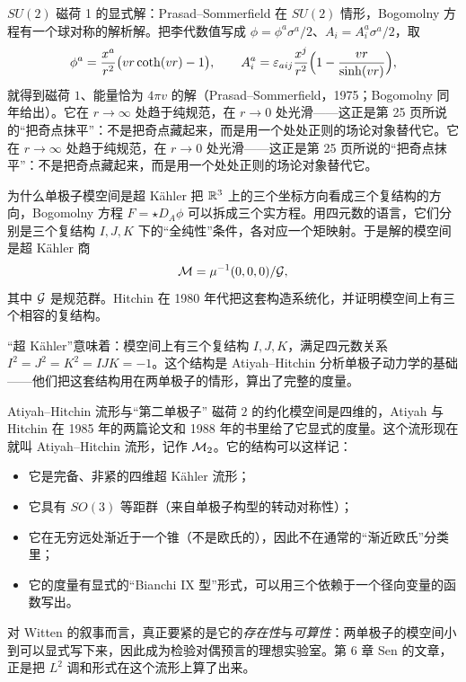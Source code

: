 \begin{pizhu}{$SU(2)$ 磁荷 1 的显式解：Prasad--Sommerfield}
在 $SU(2)$ 情形，Bogomolny 方程有一个球对称的解析解。把李代数值写成 $\phi=\phi^a\sigma^a/2$、$A_i=A_i^a\sigma^a/2$，取
\[
  \phi^a=\frac{x^a}{r^2}\bigl(vr\coth(vr)-1\bigr),\qquad
  A_i^a=\varepsilon_{aij}\frac{x^j}{r^2}\Bigl(1-\frac{vr}{\sinh(vr)}\Bigr),
\]
就得到磁荷 $1$、能量恰为 $4\pi v$ 的解（Prasad--Sommerfield，1975；Bogomolny 同年给出）。它在 $r\to\infty$ 处趋于纯规范，在 $r\to0$ 处光滑——这正是第 25 页所说的“把奇点抹平”：不是把奇点藏起来，而是用一个处处正则的场论对象替代它。它在 $r\to\infty$ 处趋于纯规范，在 $r\to0$ 处光滑——这正是第 25 页所说的“把奇点抹平”：不是把奇点藏起来，而是用一个处处正则的场论对象替代它。
\end{pizhu}

\begin{pizhu}{为什么单极子模空间是超 Kähler}
把 $\mathbb{R}^3$ 上的三个坐标方向看成三个复结构的方向，Bogomolny 方程 $F=\star D_A\phi$ 可以拆成三个实方程。用四元数的语言，它们分别是三个复结构 $I,J,K$ 下的“全纯性”条件，各对应一个矩映射。于是解的模空间是超 Kähler 商
\[
  \mathcal{M}=\mu^{-1}(0,0,0)/\mathcal{G} ,
\]
其中 $\mathcal{G}$ 是规范群。Hitchin 在 1980 年代把这套构造系统化，并证明模空间上有三个相容的复结构。

“超 Kähler”意味着：模空间上有三个复结构 $I,J,K$，满足四元数关系 $I^2=J^2=K^2=IJK=-1$。这个结构是 Atiyah--Hitchin 分析单极子动力学的基础——他们把这套结构用在两单极子的情形，算出了完整的度量。
\end{pizhu}

\begin{pizhu}{Atiyah--Hitchin 流形与“第二单极子”}
磁荷 $2$ 的约化模空间是四维的，Atiyah 与 Hitchin 在 1985 年的两篇论文和 1988 年的书里给了它显式的度量。这个流形现在就叫 Atiyah--Hitchin 流形，记作 $\mathcal{M}_2$。它的结构可以这样记：

\begin{itemize}
  \item 它是完备、非紧的四维超 Kähler 流形；
  \item 它具有 $SO(3)$ 等距群（来自单极子构型的转动对称性）；
  \item 它在无穷远处渐近于一个锥（不是欧氏的），因此不在通常的“渐近欧氏”分类里；
  \item 它的度量有显式的“Bianchi IX 型”形式，可以用三个依赖于一个径向变量的函数写出。
\end{itemize}

对 Witten 的叙事而言，真正要紧的是它的\emph{存在性}与\emph{可算性}：两单极子的模空间小到可以显式写下来，因此成为检验对偶预言的理想实验室。第 6 章 Sen 的文章，正是把 $L^2$ 调和形式在这个流形上算了出来。
\end{pizhu}

